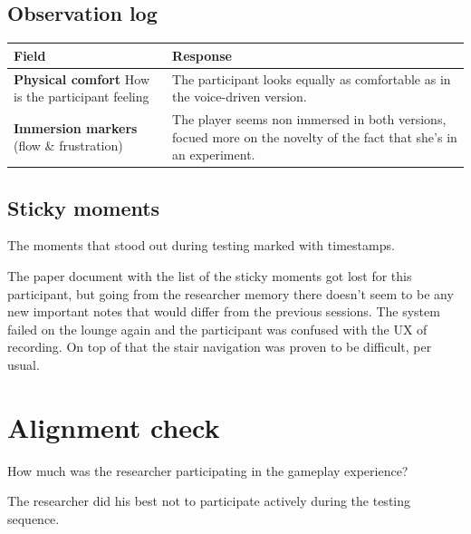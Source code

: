 \subsection{Observation log}
\begin{table}[h]
\centering
\begin{tabular}{|p{5cm}|p{10cm}|}
\hline
\textbf{Field} & \textbf{Response} \\ \hline
\textbf{Physical comfort} How is the participant feeling & The participant looks equally as comfortable as in the voice-driven version. \\[1.5cm] \hline
\textbf{Immersion markers} (flow \& frustration) & The player seems non immersed in both versions, focued more on the novelty of the fact that she's in an experiment.\\[1.5cm] \hline
\end{tabular}
\end{table}


\subsection{Sticky moments}
The moments that stood out during testing marked with timestamps.

The paper document with the list of the sticky moments got lost for this participant,
but going from the researcher memory there doesn't seem to be any new important notes that would differ from the previous sessions.
The system failed on the lounge again and the participant was confused with the UX of recording. On top of that the stair navigation was proven
to be difficult, per usual.


\section{Alignment check}
How much was the researcher participating in the gameplay experience? 

The researcher did his best not to participate actively during the testing sequence. 



